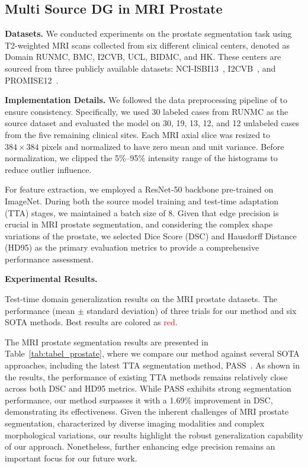 \subsection{Multi Source DG in MRI Prostate}
\noindent \textbf{Datasets.}
We conducted experiments on the prostate segmentation task using T2-weighted MRI scans collected from six different clinical centers, denoted as Domain RUNMC, BMC, I2CVB, UCL, BIDMC, and HK. These centers are sourced from three publicly available datasets: NCI-ISBI13~\cite{nicholas2015nci}, I2CVB~\cite{lemaitre2015computer}, and PROMISE12~\cite{litjens2014evaluation}.

\noindent \textbf{Implementation Details.}
We followed the data preprocessing pipeline of \cite{zhang2024pass} to ensure consistency. Specifically, we used 30 labeled cases from RUNMC as the source dataset and evaluated the model on 30, 19, 13, 12, and 12 unlabeled cases from the five remaining clinical sites. Each MRI axial slice was resized to $384 \times 384$ pixels and normalized to have zero mean and unit variance. Before normalization, we clipped the 5\%–95\% intensity range of the histograms to reduce outlier influence.

For feature extraction, we employed a ResNet-50 backbone pre-trained on ImageNet. During both the source model training and test-time adaptation (TTA) stages, we maintained a batch size of 8.
Given that edge precision is crucial in MRI prostate segmentation, and considering the complex shape variations of the prostate, we selected Dice Score (DSC) and Hausdorff Distance (HD95) as the primary evaluation metrics to provide a comprehensive performance assessment.

\noindent \textbf{Experimental Results.}
\begin{table}[h!]
\centering
  \caption{Test-time domain generalization results on the MRI prostate datasets.  The performance (mean $\pm$ standard deviation) of three trials for our method and six SOTA methods. Best results are colored as \textcolor{red}{red}.}
  \begin{adjustbox}{width=0.969\linewidth}
    
  \end{adjustbox}
  \label{tab:tabel_prostate}
\end{table}
The MRI prostate segmentation results are presented in Table~\ref{tab:tabel_prostate}, where we compare our method against several SOTA approaches, including the latest TTA segmentation method, PASS~\cite{zhang2024pass}.
As shown in the results, the performance of existing TTA methods remains relatively close across both DSC and HD95 metrics. While PASS exhibits strong segmentation performance, our method surpasses it with a 1.69\% improvement in DSC, demonstrating its effectiveness.
Given the inherent challenges of MRI prostate segmentation, characterized by diverse imaging modalities and complex morphological variations, our results highlight the robust generalization capability of our approach. Nonetheless, further enhancing edge precision remains an important focus for our future work.

